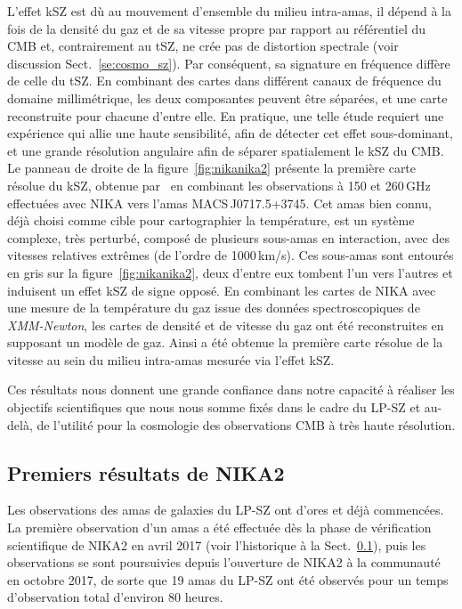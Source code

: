 L'effet kSZ est dù au mouvement d'ensemble du milieu intra-amas, il
dépend à la fois de la densité du gaz et de sa vitesse propre par
rapport au référentiel du CMB et, contrairement au tSZ, ne crée pas de
distortion spectrale (voir discussion Sect.~\ref{se:cosmo_sz}). Par
conséquent, sa signature en fréquence diffère de celle du tSZ. En
combinant des cartes dans différent canaux de fréquence du domaine
millimétrique, les deux composantes peuvent être séparées, et une
carte reconstruite pour chacune d'entre elle. En pratique, une telle
étude requiert une expérience qui allie une haute sensibilité, afin de
détecter cet effet sous-dominant, et une grande résolution angulaire
afin de séparer spatialement le kSZ du CMB. Le panneau de droite de la
figure~\ref{fig:nikanika2} présente la première carte résolue
du kSZ, obtenue par~\citet{Adam2017kSZ} en combinant les
observations à 150 et 260\,GHz effectuées avec NIKA vers l'amas
MACS\,J0717.5+3745. Cet amas bien connu, déjà choisi comme
cible pour cartographier la température, est un système complexe, très
perturbé, composé de plusieurs sous-amas en interaction, avec des
vitesses relatives extrêmes (de l'ordre de 1000\,km/s). Ces sous-amas
sont entourés en gris sur la figure~\ref{fig:nikanika2}, deux d'entre
eux tombent l'un vers l'autres et induisent un effet kSZ de signe
opposé. En combinant les cartes de NIKA avec une mesure de la
température du gaz issue des données spectroscopiques de
\emph{XMM-Newton}, les cartes de densité et de vitesse du gaz ont été
reconstruites en supposant un modèle de gaz. Ainsi a été obtenue la
première carte résolue de la vitesse au sein du milieu intra-amas
mesurée via l'effet kSZ.

Ces résultats nous donnent une grande confiance dans notre capacité à
réaliser les objectifs scientifiques que nous nous somme fixés dans le
cadre du LP-SZ et au-delà, de l'utilité pour la cosmologie des
observations CMB à très haute résolution.

\subsection{Premiers résultats de NIKA2}

Les observations des amas de galaxies du LP-SZ ont d'ores et déjà
commencées. La première observation d'un amas a été
effectuée dès la phase de vérification scientifique de NIKA2 en avril
2017 (voir l'historique à la Sect.~\ref{}), puis les observations se
sont poursuivies depuis l'ouverture de NIKA2 à la communauté en
octobre 2017, de sorte que 19 amas du LP-SZ ont été observés pour un
temps d'observation total d'environ 80 heures.


